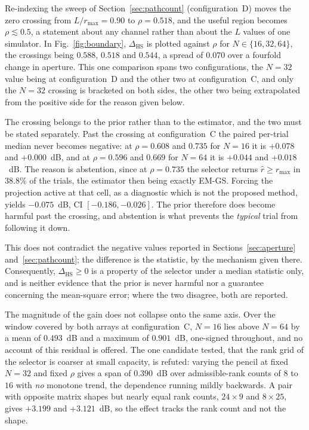 \documentclass[journal]{IEEEtran}
\newcommand{\rmax}{r_{\max}}
\newcommand{\dhs}{\Delta_{\mathrm{HS}}}
\begin{document}
Re-indexing the sweep of Section~\ref{sec:pathcount} (configuration~D) moves
the zero crossing from $L/\rmax=0.90$ to $\rho=0.518$, and the useful region
becomes $\rho\lesssim0.5$, a statement about any channel rather than about the
$L$ values of one simulator. In Fig.~\ref{fig:boundary}, $\dhs$ is plotted
against $\rho$ for $N\in\{16,32,64\}$, the crossings being $0.588$, $0.518$ and
$0.544$, a spread of $0.070$ over a fourfold change in aperture. This one
comparison spans two configurations, the $N=32$ value being at configuration~D
and the other two at configuration~C, and only the $N=32$ crossing is bracketed
on both sides, the other two being extrapolated from the positive side for the
reason given below.

The crossing belongs to the prior rather than to the estimator, and the two must
be stated separately. Past the crossing at configuration~C the paired per-trial
median never becomes negative: at $\rho=0.608$ and $0.735$ for $N=16$ it is
$+0.078$ and $+0.000$~dB, and at
$\rho=0.596$ and $0.669$ for $N=64$ it is $+0.044$ and $+0.018$~dB. The reason
is abstention, since at $\rho=0.735$ the selector returns $\hat r\ge\rmax$ in
$38.8\%$ of the trials, the estimator then being exactly EM-GS. Forcing the
projection active at that cell, as a diagnostic which is not the proposed
method, yields $-0.075$~dB, CI $[-0.186,-0.026]$. The prior therefore does
become harmful past the crossing, and abstention is what prevents the
\emph{typical} trial from following it down.

This does not contradict the negative values reported in
Sections~\ref{sec:aperture} and~\ref{sec:pathcount}; the difference is the
statistic, by the mechanism given there. Consequently, $\dhs\ge0$ is a property
of the selector under a median statistic only, and is neither evidence that the
prior is never harmful nor a guarantee concerning the mean-square error; where
the two disagree, both are reported.

The magnitude of the gain does not collapse onto the same axis. Over the window
covered by both arrays at configuration~C, $N=16$ lies above $N=64$ by a mean of
$0.493$~dB and a maximum of $0.901$~dB, one-signed throughout, and no account of
this residual is offered. The one candidate tested, that the rank grid of the
selector is coarser at small capacity, is refuted: varying the pencil at fixed
$N=32$ and fixed $\rho$ gives a span of $0.390$~dB over admissible-rank counts
of $8$ to $16$ with \emph{no} monotone trend, the dependence running mildly
backwards. A pair with opposite matrix shapes but nearly equal rank counts,
$24\times9$ and $8\times25$, gives $+3.199$ and $+3.121$~dB, so the effect tracks
the rank count and not the shape.
\end{document}
